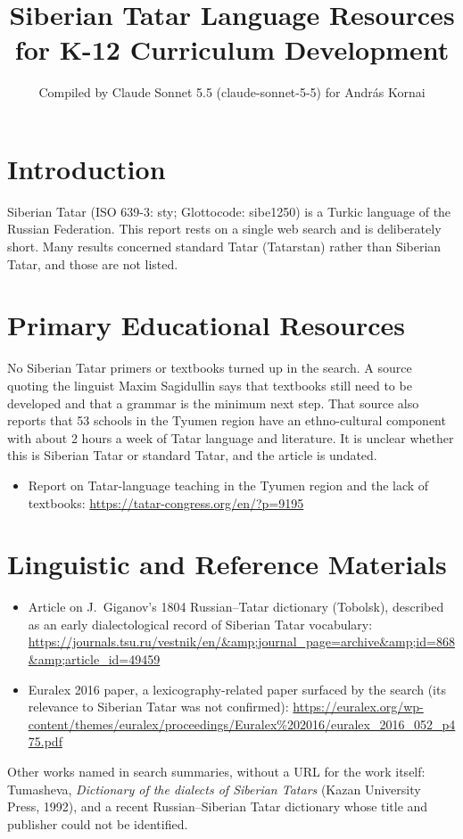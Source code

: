 \documentclass[12pt]{article}
\title{Siberian Tatar Language Resources for K-12 Curriculum Development}
\author{Compiled by Claude Sonnet 5.5 (claude-sonnet-5-5) for Andr\'as Kornai}
\date{}
\begin{document}
\maketitle

\section{Introduction}
Siberian Tatar (ISO 639-3: sty; Glottocode: sibe1250) is a Turkic language of the Russian Federation. This report rests on a single web search and is deliberately short. Many results concerned standard Tatar (Tatarstan) rather than Siberian Tatar, and those are not listed.

\section{Primary Educational Resources}
No Siberian Tatar primers or textbooks turned up in the search. A source quoting the linguist Maxim Sagidullin says that textbooks still need to be developed and that a grammar is the minimum next step. That source also reports that 53 schools in the Tyumen region have an ethno-cultural component with about 2 hours a week of Tatar language and literature. It is unclear whether this is Siberian Tatar or standard Tatar, and the article is undated.
\begin{itemize}
\item Report on Tatar-language teaching in the Tyumen region and the lack of textbooks: \url{https://tatar-congress.org/en/?p=9195}
\end{itemize}

\section{Linguistic and Reference Materials}
\begin{itemize}
\item Article on J.~Giganov's 1804 Russian--Tatar dictionary (Tobolsk), described as an early dialectological record of Siberian Tatar vocabulary: \url{https://journals.tsu.ru/vestnik/en/&amp;journal_page=archive&amp;id=868&amp;article_id=49459}
\item Euralex 2016 paper, a lexicography-related paper surfaced by the search (its relevance to Siberian Tatar was not confirmed): \url{https://euralex.org/wp-content/themes/euralex/proceedings/Euralex%202016/euralex_2016_052_p475.pdf}
\end{itemize}
Other works named in search summaries, without a URL for the work itself: Tumasheva, \emph{Dictionary of the dialects of Siberian Tatars} (Kazan University Press, 1992), and a recent Russian--Siberian Tatar dictionary whose title and publisher could not be identified.
\end{document}
